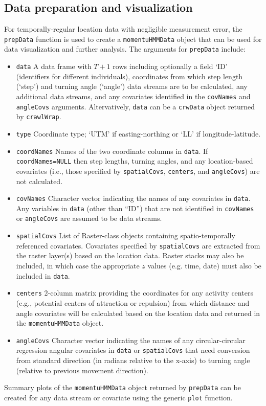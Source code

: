 \documentclass[12pt]{article}\usepackage[]{graphicx}\usepackage[]{color}
\begin{document}
\subsection{Data preparation and visualization}
For temporally-regular location data with negligible measurement error, the \verb|prepData| function is used to create a \verb|momentuHMMData| object that can be used for data visualization and further analysis. The arguments for \verb|prepData| include:
\begin{itemize}
  \item{\verb|data|} A data frame with $T+1$ rows including optionally a field `ID' (identifiers for different individuals), coordinates from which step length (`step') and turning angle (`angle') data streams are to be calculated, any additional data streams, and any covariates identified in the \verb|covNames| and \verb|angleCovs| arguments. Altervatively, \verb|data| can be a \verb|crwData| object returned by \verb|crawlWrap|.
  \item{\verb|type|} Coordinate type; `UTM' if easting-northing or `LL' if longitude-latitude.
  \item{\verb|coordNames|} Names of the two coordinate columns in \verb|data|. If \verb|coordNames=NULL| then step lengths, turning angles, and any location-based covariates (i.e., those specified by \verb|spatialCovs|, \verb|centers|, and \verb|angleCovs|) are not calculated.
  \item{\verb|covNames|} Character vector indicating the names of any covariates in \verb|data|. Any variables in \verb|data| (other than ``ID'') that are not identified in \verb|covNames| or \verb|angleCovs| are assumed to be data streams.
  \item{\verb|spatialCovs|} List of Raster-class objects \citep{Hijmans2016} containing spatio-temporally referenced covariates. Covariates specified by \verb|spatialCovs| are extracted from the raster layer(s) based on the location data. Raster stacks may also be included, in which case the appropriate $z$ values (e.g. time, date) must also be included in \verb|data|.
  \item{\verb|centers|} 2-column matrix providing the coordinates for any activity centers (e.g., potential centers of attraction or repulsion) from which distance and angle covariates will be calculated based on the location data and returned in the \verb|momentuHMMData| object.
  \item{\verb|angleCovs|} Character vector indicating the names of any circular-circular regression angular covariates in \verb|data| or \verb|spatialCovs| that need conversion from standard direction (in radians relative to the x-axis) to turning angle (relative to previous movement direction).
\end{itemize}
Summary plots of the \verb|momentuHMMData| object returned by \verb|prepData| can be created for any data stream or covariate using the generic \verb|plot| function.
\end{document}
